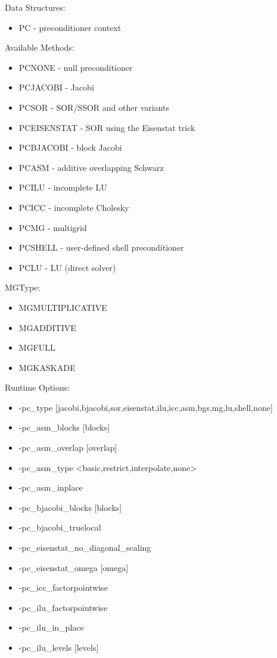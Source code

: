 {\noindent
Data Structures:
\begin{itemize}
\item PC - preconditioner context
\end{itemize}
Available Methods: 
\begin{itemize}
\item PCNONE - null preconditioner
\item PCJACOBI - Jacobi
\item PCSOR - SOR/SSOR and other variants
\item PCEISENSTAT - SOR using the Eisenstat trick
\item PCBJACOBI - block Jacobi
\item PCASM - additive overlapping Schwarz
\item PCILU - incomplete LU
\item PCICC - incomplete Cholesky
\item PCMG - multigrid
\item PCSHELL - user-defined shell preconditioner
\item PCLU - LU (direct solver)
\end{itemize}
MGType:
\begin{itemize}
\item MGMULTIPLICATIVE
\item  MGADDITIVE
\item  MGFULL
\item  MGKASKADE
\end{itemize}
Runtime Options:
\begin{itemize}
\item -pc\_type [jacobi,bjacobi,sor,eisenstat,ilu,icc,asm,bgs,mg,lu,shell,none]
\item -pc\_asm\_blocks [blocks]
\item -pc\_asm\_overlap [overlap]
\item -pc\_asm\_type <basic,restrict,interpolate,none>
\item -pc\_asm\_inplace
\item -pc\_bjacobi\_blocks [blocks]
\item -pc\_bjacobi\_truelocal
\item -pc\_eisenstat\_no\_diagonal\_scaling
\item -pc\_eisenstat\_omega [omega]
\item -pc\_icc\_factorpointwise
\item -pc\_ilu\_factorpointwise
\item -pc\_ilu\_in\_place
\item -pc\_ilu\_levels [levels]

\end{itemize}}
